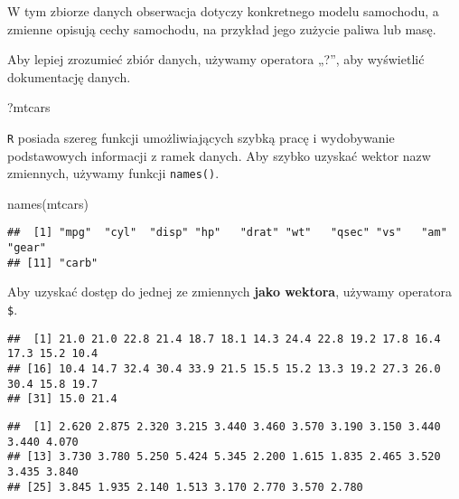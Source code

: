 \documentclass[
]{article}
\newenvironment{Shaded}{\begin{snugshade}}{\end{snugshade}}
\newcommand{\FunctionTok}[1]{\textcolor[rgb]{0.00,0.00,0.00}{#1}}
\newcommand{\NormalTok}[1]{#1}
\newcommand{\SpecialCharTok}[1]{\textcolor[rgb]{0.00,0.00,0.00}{#1}}
\begin{document}
W tym zbiorze danych obserwacja dotyczy konkretnego modelu samochodu, a
zmienne opisują cechy samochodu, na przykład jego zużycie paliwa lub
masę.

Aby lepiej zrozumieć zbiór danych, używamy operatora „?'', aby
wyświetlić dokumentację danych.

\begin{Shaded}
\begin{Highlighting}[]
\NormalTok{?mtcars}
\end{Highlighting}
\end{Shaded}

\texttt{R} posiada szereg funkcji umożliwiających szybką pracę i
wydobywanie podstawowych informacji z ramek danych. Aby szybko uzyskać
wektor nazw zmiennych, używamy funkcji \texttt{names()}.

\begin{Shaded}
\begin{Highlighting}[]
\FunctionTok{names}\NormalTok{(mtcars)}
\end{Highlighting}
\end{Shaded}

\begin{verbatim}
##  [1] "mpg"  "cyl"  "disp" "hp"   "drat" "wt"   "qsec" "vs"   "am"   "gear"
## [11] "carb"
\end{verbatim}

Aby uzyskać dostęp do jednej ze zmiennych \textbf{jako wektora}, używamy
operatora \texttt{\$}.

\begin{Shaded}
\end{Shaded}

\begin{verbatim}
##  [1] 21.0 21.0 22.8 21.4 18.7 18.1 14.3 24.4 22.8 19.2 17.8 16.4 17.3 15.2 10.4
## [16] 10.4 14.7 32.4 30.4 33.9 21.5 15.5 15.2 13.3 19.2 27.3 26.0 30.4 15.8 19.7
## [31] 15.0 21.4
\end{verbatim}

\begin{Shaded}
\end{Shaded}

\begin{verbatim}
##  [1] 2.620 2.875 2.320 3.215 3.440 3.460 3.570 3.190 3.150 3.440 3.440 4.070
## [13] 3.730 3.780 5.250 5.424 5.345 2.200 1.615 1.835 2.465 3.520 3.435 3.840
## [25] 3.845 1.935 2.140 1.513 3.170 2.770 3.570 2.780
\end{verbatim}
\end{document}
